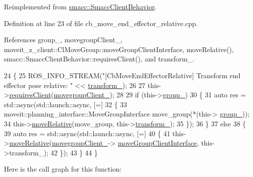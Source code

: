 Reimplemented from \hyperlink{classsmacc_1_1SmaccClientBehavior_a7962382f93987c720ad432fef55b123f}{smacc\+::\+Smacc\+Client\+Behavior}.



Definition at line 23 of file cb\+\_\+move\+\_\+end\+\_\+effector\+\_\+relative.\+cpp.



References group\+\_\+, movegroup\+Client\+\_\+, moveit\+\_\+z\+\_\+client\+::\+Cl\+Move\+Group\+::move\+Group\+Client\+Interface, move\+Relative(), smacc\+::\+Smacc\+Client\+Behavior\+::requires\+Client(), and transform\+\_\+.


\begin{DoxyCode}
24 \{
25     ROS\_INFO\_STREAM(\textcolor{stringliteral}{"[CbMoveEndEffectorRelative] Transform end effector pose relative: "} << 
      \hyperlink{classmoveit__z__client_1_1CbMoveEndEffectorRelative_a0686340d0328df4d0ecb962b61026f43}{transform\_});
26 
27     this->\hyperlink{classsmacc_1_1SmaccClientBehavior_a917f001e763a1059af337bf4e164f542}{requiresClient}(\hyperlink{classmoveit__z__client_1_1CbMoveEndEffectorRelative_a5f009b3baaaa47ad3be09d43bab33c07}{movegroupClient\_});
28 
29     \textcolor{keywordflow}{if} (this->\hyperlink{classmoveit__z__client_1_1CbMoveEndEffectorRelative_a143fdce14603f8c78aae258b605ff607}{group\_})
30     \{
31         \textcolor{keyword}{auto} res = std::async(std::launch::async, [=] 
32         \{
33                 moveit::planning\_interface::MoveGroupInterface move\_group(*(this->
      \hyperlink{classmoveit__z__client_1_1CbMoveEndEffectorRelative_a143fdce14603f8c78aae258b605ff607}{group\_}));
34                 this->\hyperlink{classmoveit__z__client_1_1CbMoveEndEffectorRelative_ae80ce575678a1f602d2fc1f68df1813f}{moveRelative}(move\_group, this->\hyperlink{classmoveit__z__client_1_1CbMoveEndEffectorRelative_a0686340d0328df4d0ecb962b61026f43}{transform\_});
35         \});
36     \}
37     \textcolor{keywordflow}{else}
38     \{
39         \textcolor{keyword}{auto} res = std::async(std::launch::async, [=] 
40         \{
41             this->\hyperlink{classmoveit__z__client_1_1CbMoveEndEffectorRelative_ae80ce575678a1f602d2fc1f68df1813f}{moveRelative}(\hyperlink{classmoveit__z__client_1_1CbMoveEndEffectorRelative_a5f009b3baaaa47ad3be09d43bab33c07}{movegroupClient\_}->
      \hyperlink{classmoveit__z__client_1_1ClMoveGroup_af86e046b837be0ef4afa9893d8808f20}{moveGroupClientInterface}, this->transform\_);
42         \});
43     \}
44 \}
\end{DoxyCode}
Here is the call graph for this function\+:
